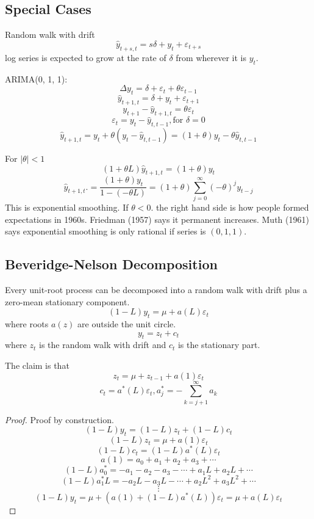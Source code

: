 \documentclass[11pt, a4paper, oneside]{article}
\theoremstyle{definition}
\theoremstyle{proposition}
\theoremstyle{corollary}
\theoremstyle{lemma}
\theoremstyle{theorem}
\begin{document}
\subsection{Special Cases}
Random walk with drift
$$\hat{y}_{t+s, t} = s \delta + y_t +\varepsilon_{t+s}$$
log series is expected to grow at the rate of $\delta$ from wherever it is $y_t$. 

ARIMA(0, 1, 1):
$$\Delta y_t = \delta + \varepsilon_t + \theta \varepsilon_{t-1}$$
$$\hat{y}_{t+1, t} = \delta + y_t + \varepsilon_{t+1}$$
$$y_{t+1} - \hat{y}_{t+1, t} = \theta\varepsilon_t$$
$$\varepsilon_t = y_t - \hat{y}_{t, t-1}, \text{for } \delta = 0$$
$$\hat{y}_{t+1, t} = y_t + \theta(y_t - \hat{y}_{t, t-1}) = (1+ \theta)y_t - \theta\hat{y}_{t, t-1}$$

For $|\theta| < 1$
$$(1+ \theta L)\hat{y}_{t+1, t} = (1+ \theta) y_t$$
$$\hat{y}_{t+1, t}. =\frac{(1+\theta)y_t}{1 - (-\theta L)} = (1+ \theta)\sum_{j=0}^{\infty} (-\theta)^j y_{t-j}$$
This is exponential smoothing. If $\theta < 0$. the right hand side is how people formed expectations in 1960s. Friedman (1957) says it permanent increases. Muth (1961) says exponential smoothing is only rational if series is $(0, 1, 1)$.  

\subsection{Beveridge-Nelson Decomposition}
Every unit-root process can be decomposed into a random walk with drift plus a zero-mean stationary component. 
$$(1- L)y_t = \mu + a(L) \varepsilon_t$$ where roots $a(z)$ are outside the unit circle. 
$$y_t = z_t + c_t$$ where $z_t$ is the random walk with drift and $c_t$ is the stationary part. 

The claim is that 
$$z_t = \mu + z_{t -1} + a(1)\varepsilon_t$$
$$c_t = a^*(L)\varepsilon_t, a_j^* = - \sum_{k=j+1}^{\infty} a_k$$
\begin{proof}
Proof by construction. 
$$(1- L)y_t = (1- L)z_t + (1- L)c_t$$
$$(1- L)z_t = \mu + a(1) \varepsilon_t$$
$$(1- L)c_t = (1- L) a^*(L) \varepsilon_t$$
$$a(1) = a_0 + a_1 +a_2+a_3+\cdots$$
$$(1- L) a_0^* = -a_1 - a_2 - a_3 - \cdots + a_1L +a_2L+ \cdots$$
$$(1- L)a_1^*L = - a_2L - a_3L - \cdots + a_2L^2 + a_3L^2+\cdots$$
$$\vdots$$
$$(1-L)y_t = \mu +(a(1)+(1-L)a^*(L))\varepsilon_t = \mu + a(L)\varepsilon_t$$
\end{proof}
\end{document}
